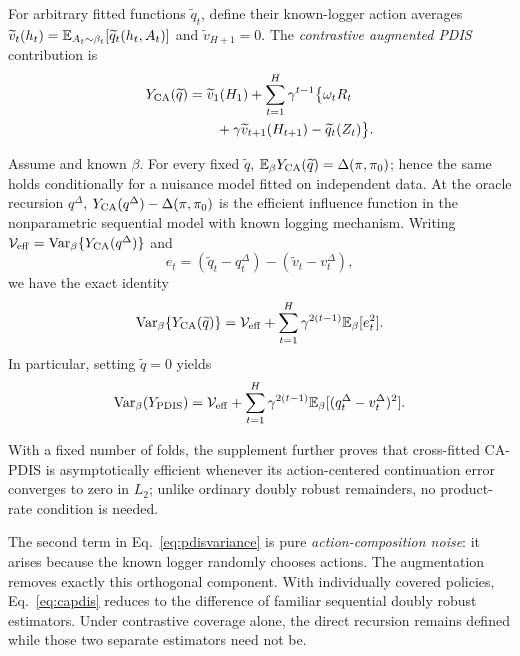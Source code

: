 For arbitrary fitted functions $\widetilde q_t$, define their known-logger action averages
$\widetilde v_t(h_t)=\mathbb{E}_{A_t\sim\beta_t}[\widetilde q_t(h_t,A_t)]$
and $\widetilde v_{H+1}=0$. The \emph{contrastive augmented PDIS} contribution is
\begin{equation}
\begin{aligned}
Y_{\rm CA}(\widetilde q)
&=\widetilde v_1(H_1)+\sum_{t=1}^H\gamma^{t-1}\bigl\{\omega_tR_t\\
&\qquad+\gamma\widetilde v_{t+1}(H_{t+1})-\widetilde q_t(Z_t)\bigr\}.
\end{aligned}
\label{eq:capdis}
\end{equation}

\begin{theorem}
\label{thm:efficiency}
Assume \UCC and known $\beta$.
For every fixed $\widetilde q$, $\mathbb{E}_\beta Y_{\rm CA}(\widetilde q)=\Delta(\pi,\pi_0)$; hence the same holds conditionally for a nuisance model fitted on independent data. At the oracle recursion $q^\Delta$, $Y_{\rm CA}(q^\Delta)-\Delta(\pi,\pi_0)$ is the efficient influence function in the nonparametric sequential model with known logging mechanism. Writing $\mathcal V_{\rm eff}=\operatorname{Var}_\beta\{Y_{\rm CA}(q^\Delta)\}$ and
\[
e_t=(\widetilde q_t-q_t^\Delta)-(\widetilde v_t-v_t^\Delta),
\]
we have the exact identity
\begin{equation}
\operatorname{Var}_\beta\{Y_{\rm CA}(\widetilde q)\}
=\mathcal V_{\rm eff}+
\sum_{t=1}^H\gamma^{2(t-1)}\mathbb{E}_\beta[e_t^2].
\label{eq:generalvariance}
\end{equation}
In particular, setting $\widetilde q=0$ yields
\begin{equation}
\operatorname{Var}_\beta(Y_{\rm PDIS})
=\mathcal V_{\rm eff}+
\sum_{t=1}^H\gamma^{2(t-1)}
\mathbb{E}_\beta[(q_t^\Delta-v_t^\Delta)^2].
\label{eq:pdisvariance}
\end{equation}
\end{theorem}
With a fixed number of folds, the supplement further proves that cross-fitted CA-PDIS is asymptotically efficient whenever its action-centered continuation error converges to zero in $L_2$; unlike ordinary doubly robust remainders, no product-rate condition is needed.

The second term in Eq.~\eqref{eq:pdisvariance} is pure \emph{action-composition noise}: it arises because the known logger randomly chooses actions. The augmentation removes exactly this orthogonal component. With individually covered policies, Eq.~\eqref{eq:capdis} reduces to the difference of familiar sequential doubly robust estimators. Under contrastive coverage alone, the direct recursion remains defined while those two separate estimators need not be.

